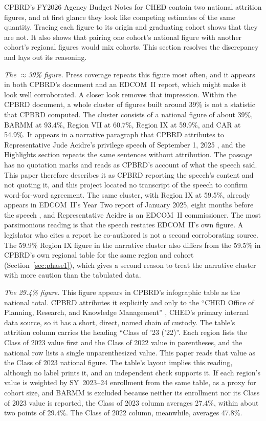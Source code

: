 \documentclass[11pt]{article}
\begin{document}
CPBRD's FY2026 Agency Budget Notes for CHED contain two national attrition figures, and at first glance they look like competing estimates of the same quantity. Tracing each figure to its origin and graduating cohort shows that they are not. It also shows that pairing one cohort's national figure with another cohort's regional figures would mix cohorts. This section resolves the discrepancy and lays out its reasoning.

\emph{The $\approx$39\% figure.} Press coverage repeats this figure most often, and it appears in both CPBRD's document and an EDCOM~II report, which might make it look well corroborated. A closer look removes that impression. Within the CPBRD document, a whole cluster of figures built around 39\% is not a statistic that CPBRD computed. The cluster consists of a national figure of about 39\%, BARMM at 93.4\%, Region VII at 60.7\%, Region IX at 59.9\%, and CAR at 54.9\%. It appears in a narrative paragraph that CPBRD attributes to Representative Jude Acidre's privilege speech of September 1, 2025 \citep{cpbrd2026}, and the Highlights section repeats the same sentences without attribution. The passage has no quotation marks and reads as CPBRD's account of what the speech said. This paper therefore describes it as CPBRD reporting the speech's content and not quoting it, and this project located no transcript of the speech to confirm word-for-word agreement. The same cluster, with Region IX at 59.5\%, already appears in EDCOM~II's Year Two report of January 2025, eight months before the speech \citep{edcom2025y2}, and Representative Acidre is an EDCOM~II commissioner. The most parsimonious reading is that the speech restates EDCOM~II's own figure. A legislator who cites a report he co-authored is not a second corroborating source. The 59.9\% Region IX figure in the narrative cluster also differs from the 59.5\% in CPBRD's own regional table for the same region and cohort (Section~\ref{sec:phase1}), which gives a second reason to treat the narrative cluster with more caution than the tabulated data.

\emph{The 29.4\% figure.} This figure appears in CPBRD's infographic table as the national total. CPBRD attributes it explicitly and only to the ``CHED Office of Planning, Research, and Knowledge Management'' \citep{cpbrd2026}, CHED's primary internal data source, so it has a short, direct, named chain of custody. The table's attrition column carries the heading ``Class of '23 ('22)''. Each region lists the Class of 2023 value first and the Class of 2022 value in parentheses, and the national row lists a single unparenthesized value. This paper reads that value as the Class of 2023 national figure. The table's layout implies this reading, although no label prints it, and an independent check supports it. If each region's value is weighted by SY~2023--24 enrollment from the same table, as a proxy for cohort size, and BARMM is excluded because neither its enrollment nor its Class of 2023 value is reported, the Class of 2023 column averages 27.4\%, within about two points of 29.4\%. The Class of 2022 column, meanwhile, averages 47.8\%.
\end{document}
